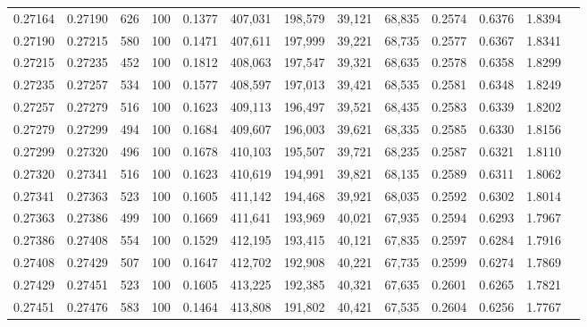 \begin{tabular}{rrrrrrrrrrrrr}
0.27164 & 0.27190 &   626 & 100 &                                     0.1377 & 407,031 & 198,579 &  39,121 &  68,835 & 0.2574 & 0.6376 & 1.8394 \\
0.27190 & 0.27215 &   580 & 100 &                                     0.1471 & 407,611 & 197,999 &  39,221 &  68,735 & 0.2577 & 0.6367 & 1.8341 \\
0.27215 & 0.27235 &   452 & 100 &                                     0.1812 & 408,063 & 197,547 &  39,321 &  68,635 & 0.2578 & 0.6358 & 1.8299 \\
0.27235 & 0.27257 &   534 & 100 &                                     0.1577 & 408,597 & 197,013 &  39,421 &  68,535 & 0.2581 & 0.6348 & 1.8249 \\
0.27257 & 0.27279 &   516 & 100 &                                     0.1623 & 409,113 & 196,497 &  39,521 &  68,435 & 0.2583 & 0.6339 & 1.8202 \\
0.27279 & 0.27299 &   494 & 100 &                                     0.1684 & 409,607 & 196,003 &  39,621 &  68,335 & 0.2585 & 0.6330 & 1.8156 \\
0.27299 & 0.27320 &   496 & 100 &                                     0.1678 & 410,103 & 195,507 &  39,721 &  68,235 & 0.2587 & 0.6321 & 1.8110 \\
0.27320 & 0.27341 &   516 & 100 &                                     0.1623 & 410,619 & 194,991 &  39,821 &  68,135 & 0.2589 & 0.6311 & 1.8062 \\
0.27341 & 0.27363 &   523 & 100 &                                     0.1605 & 411,142 & 194,468 &  39,921 &  68,035 & 0.2592 & 0.6302 & 1.8014 \\
0.27363 & 0.27386 &   499 & 100 &                                     0.1669 & 411,641 & 193,969 &  40,021 &  67,935 & 0.2594 & 0.6293 & 1.7967 \\
0.27386 & 0.27408 &   554 & 100 &                                     0.1529 & 412,195 & 193,415 &  40,121 &  67,835 & 0.2597 & 0.6284 & 1.7916 \\
0.27408 & 0.27429 &   507 & 100 &                                     0.1647 & 412,702 & 192,908 &  40,221 &  67,735 & 0.2599 & 0.6274 & 1.7869 \\
0.27429 & 0.27451 &   523 & 100 &                                     0.1605 & 413,225 & 192,385 &  40,321 &  67,635 & 0.2601 & 0.6265 & 1.7821 \\
0.27451 & 0.27476 &   583 & 100 &                                     0.1464 & 413,808 & 191,802 &  40,421 &  67,535 & 0.2604 & 0.6256 & 1.7767 \\

\end{tabular}
